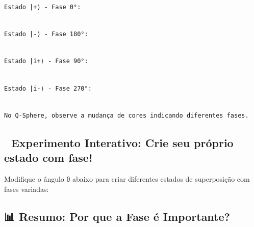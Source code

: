 \documentclass[
  brazilian,
]{report}
\begin{document}
\begin{verbatim}
Estado |+⟩ - Fase 0°:
\end{verbatim}

\begin{verbatim}

Estado |-⟩ - Fase 180°:
\end{verbatim}

\begin{verbatim}

Estado |i+⟩ - Fase 90°:
\end{verbatim}

\begin{verbatim}

Estado |i-⟩ - Fase 270°:
\end{verbatim}

\begin{verbatim}

No Q-Sphere, observe a mudança de cores indicando diferentes fases.
\end{verbatim}

\subsection{🧪 Experimento Interativo: Crie seu próprio estado com
fase!}\label{experimento-interativo-crie-seu-pruxf3prio-estado-com-fase}

Modifique o ângulo θ abaixo para criar diferentes estados de
superposição com fases variadas:

\subsection{📊 Resumo: Por que a Fase é
Importante?}\label{resumo-por-que-a-fase-uxe9-importante}
\end{document}
